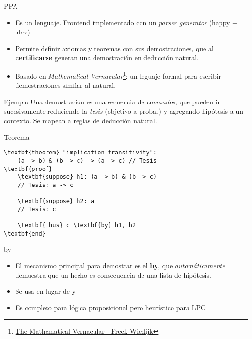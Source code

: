 \documentclass[xcolor={dvipsnames},spanish]{beamer}
\begin{document}
\begin{frame}{PPA}
    \begin{itemize}
        \item Es un lenguaje. Frontend implementado con un \textit{parser generator} (happy + alex)
        \item Permite definir axiomas y teoremas con sus demostraciones, que al \textbf{certificarse} generan una demostración en deducción natural.
        \item Basado en \textit{Mathematical Vernacular}\footnote{\href{https://www.cs.ru.nl/~freek/notes/mv.pdf}{The Mathematical Vernacular - Freek Wiedijk}}: un leguaje formal para escribir demostraciones similar al natural.
    \end{itemize}
\end{frame}


\begin{frame}[fragile]{Ejemplo}
    Una demostración es una secuencia de \textit{comandos}, que pueden ir sucesivamente reduciendo la \textit{tesis} (objetivo a probar) y agregando hipótesis a un contexto. Se mapean a reglas de deducción natural.

\begin{block}{Teorema}
    \begin{Verbatim}[commandchars=\\\{\}]
\textbf{theorem} "implication transitivity":
    (a -> b) & (b -> c) -> (a -> c) // Tesis
\textbf{proof}        
    \textbf{suppose} h1: (a -> b) & (b -> c)
    // Tesis: a -> c
    
    \textbf{suppose} h2: a
    // Tesis: c
    
    \textbf{thus} c \textbf{by} h1, h2
\textbf{end}
\end{Verbatim}

\end{block}
\end{frame}

\begin{frame}{by}
    \begin{itemize}
        \item El mecanismo principal para demostrar es el \textbf{by}, que \textit{automáticamente} demuestra que un hecho es consecuencia de una lista de hipótesis.
        \item Se usa en lugar de  y 
        \item Es completo para lógica proposicional pero heurístico para LPO
    \end{itemize}
\end{frame}
\end{document}
